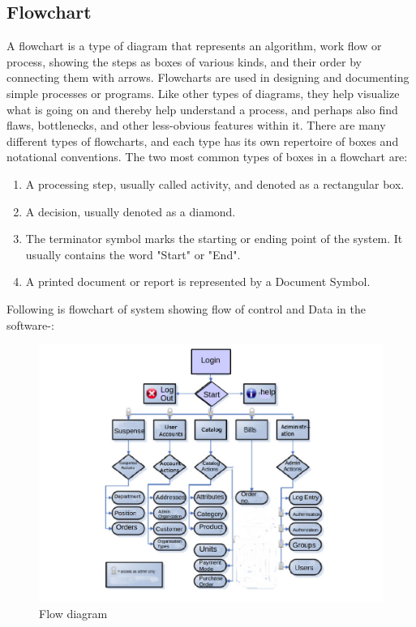 \subsection{Flowchart}
A flowchart is a type of diagram that represents an algorithm, work flow or process, showing the steps as boxes of various kinds, and their order by connecting them with arrows. 
Flowcharts are used in designing and documenting simple processes or programs. Like other types of diagrams, they help visualize what is going on and thereby help understand a process, and perhaps also find flaws, bottlenecks, and other less-obvious features within it. There are many different types of flowcharts, and each type has its own repertoire of boxes and notational conventions. The two most common types of boxes in a flowchart are:
\begin{enumerate}
\item A processing step, usually called activity, and denoted as a rectangular box.
\item A decision, usually denoted as a diamond.
\item The terminator symbol marks the starting or ending point of the system. It usually contains the word "Start" or "End".
\item A printed document or report is represented by a Document Symbol.
\end{enumerate}
Following is flowchart of system showing flow of control and Data in the software-:

\begin{figure}[h!]
\centering \includegraphics[scale=0.7]{input/images/yup.png}
\caption{ Flow diagram}
\label{fig:UI1}
\end{figure}


